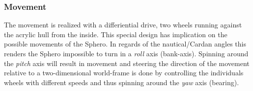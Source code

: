 \subsubsection{Movement}

The movement is realized with a differiential drive, two wheels running against the acrylic hull from the inside. This special design has implication on the possible movements of the Sphero. In regards of the nautical/Cardan angles  this renders the Sphero impossible to turn in a \emph{roll} axis (bank-axis). Spinning around the \emph{pitch} axis will result in movement and steering the direction of the movement relative to a two-dimensional world-frame is done by controlling the individuals wheels with different speeds and thus spinning around the \emph{yaw} axis (bearing).